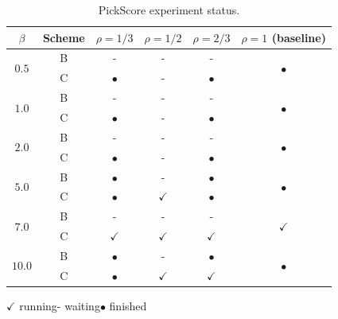 \documentclass{article} %
\begin{document}
\begin{table}[H]
    \centering
    \caption{PickScore experiment status.}
    \label{tab:pickscore-current-running-sweep}
    \footnotesize
    \setlength{\tabcolsep}{5pt}
    \renewcommand{\arraystretch}{0.95}
    \begin{tabular}{@{}c c c c c c@{}}
        \toprule
        $\beta$ & Scheme & $\rho=1/3$ & $\rho=1/2$ & $\rho=2/3$ & $\rho=1$ (baseline) \\
        \midrule
        \multirow{2}{*}{$0.5$} & B & - & - & - & \multirow{2}{*}{$\bullet$} \\
                                  & C & $\bullet$ & - & $\bullet$ & \\
        \midrule
        \multirow{2}{*}{$1.0$} & B & - & - & - & \multirow{2}{*}{$\bullet$} \\
                                  & C & $\bullet$ & - & $\bullet$ & \\
        \midrule
        \multirow{2}{*}{$2.0$} & B & - & - & - & \multirow{2}{*}{$\bullet$} \\
                                  & C & $\bullet$ & - & $\bullet$ & \\
        \midrule
        \multirow{2}{*}{$5.0$} & B & $\bullet$ & - & $\bullet$ & \multirow{2}{*}{$\bullet$} \\
                                  & C & $\bullet$ & $\checkmark$ & $\bullet$ & \\
        \midrule
        \multirow{2}{*}{$7.0$} & B & - & - & - & \multirow{2}{*}{$\checkmark$} \\
                                  & C & $\checkmark$ & $\checkmark$ & $\checkmark$ & \\
        \midrule
        \multirow{2}{*}{$10.0$} & B & $\bullet$ & - & $\bullet$ & \multirow{2}{*}{$\bullet$} \\
                                  & C & $\bullet$ & $\checkmark$ & $\checkmark$ & \\
        \bottomrule
    \end{tabular}

    \vspace{0.3em}
    \scriptsize
    $\checkmark$ running\qquad - waiting\qquad $\bullet$ finished
\end{table}
\end{document}
